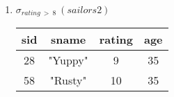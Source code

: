\documentclass{article}
\begin{document}
\begin{landscape}
		\begin{enumerate}
			\item $\sigma_{rating\ >\ 8}\ (sailors2)$
			
			\begin{table}[H]
				\begin{tabular}{||c c c c||}
					\hline
					sid & sname & rating & age \\ [0.5ex]
					\hline\hline
					28 & "Yuppy" & 9 & 35 \\
					58 & "Rusty" & 10 & 35 \\ [1ex]
					\hline
				\end{tabular}
				\label{table:relation_sailors2_selection_51vjin}
			\end{table}
			
			
		\end{enumerate}
			
			
		
	\end{landscape}
\end{document}

